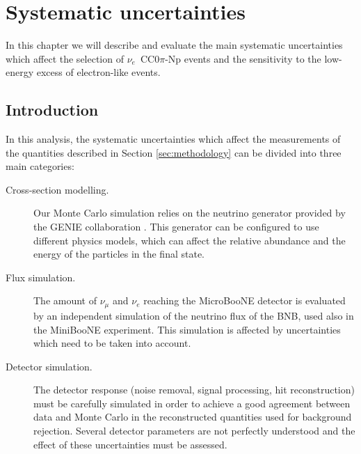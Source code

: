 \chapter{Systematic uncertainties}\label{sec:systematics}
\minitoc

In this chapter we will describe and evaluate the main systematic uncertainties which affect the selection of $\nu_e$~CC0$\pi$-Np events and the sensitivity to the low-energy excess of electron-like events.

\section{Introduction}
In this analysis, the systematic uncertainties which affect the measurements of the quantities described in Section \ref{sec:methodology} can be divided into three main categories: 
\begin{description}
\item[Cross-section modelling.] Our Monte Carlo simulation relies on the neutrino generator provided by the GENIE collaboration \cite{Andreopoulos:2009rq}. This generator can be configured to use different physics models, which can affect the relative abundance and the energy of the particles in the final state.
\item[Flux simulation.] The amount of $\nu_{\mu}$ and $\nu_{e}$ reaching the MicroBooNE detector is evaluated by an independent simulation of the neutrino flux of the BNB, used also in the MiniBooNE experiment. This simulation is affected by uncertainties which need to be taken into account.
\item[Detector simulation.] The detector response (noise removal, signal processing, hit reconstruction) must be carefully simulated in order to achieve a good agreement between data and Monte Carlo in the reconstructed quantities used for background rejection. Several detector parameters are not perfectly understood and the effect of these uncertainties must be assessed. 
\end{description}

